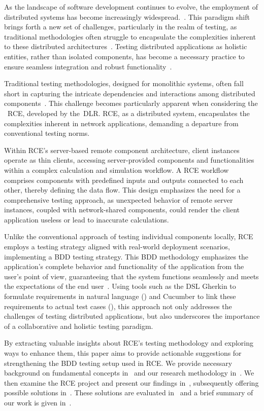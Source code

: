 As the landscape of software development continues to evolve, the employment of distributed systems has become increasingly widespread.~\cite{Xingang2018,Feldman1978}. This paradigm shift brings forth a new set of challenges, particularly in the realm of testing, as traditional methodologies often struggle to encapsulate the complexities inherent to these distributed architectures~\cite{Liu,Lima2017}. Testing distributed applications as holistic entities, rather than isolated components, has become a necessary practice to ensure seamless integration and robust functionality~\cite{Liu,Lima2017}.

Traditional testing methodologies, designed for monolithic systems, often fall short in capturing the intricate dependencies and interactions among distributed components~\cite{Liu,Lima2017}. This challenge becomes particularly apparent when considering the ~\acf{RCE}, developed by the~\acf{DLR}. \ac{RCE}, as a distributed system, encapsulates the complexities inherent in network applications, demanding a departure from conventional testing norms.

Within \ac{RCE}'s server-based remote component architecture, client instances operate as thin clients, accessing server-provided components and functionalities within a complex calculation and simulation workflow. A \ac{RCE} workflow comprises components with predefined inputs and outputs connected to each other, thereby defining the data flow. This design emphasizes the need for a comprehensive testing approach, as unexpected behavior of remote server instances, coupled with network-shared components, could render the client application useless or lead to inaccurate calculations.

Unlike the conventional approach of testing individual components locally, \ac{RCE} employs a testing strategy aligned with real-world deployment scenarios, implementing a \ac{BDD} testing strategy. This \ac{BDD} methodology emphasizes the application's complete behavior and functionality of the application from the user's point of view, guaranteeing that the system functions seamlessly and meets the expectations of the end user~\cite{wynne2012cucumber}. Using tools such as the \ac{DSL} Gherkin to formulate requirements in natural language () and Cucumber to link these requirements to actual test cases (), this approach not only addresses the challenges of testing distributed applications, but also underscores the importance of a collaborative and holistic testing paradigm.

By extracting valuable insights about \ac{RCE}'s testing methodology and exploring ways to enhance them, this paper aims to provide actionable suggestions for strengthening the \ac{BDD} testing setup used in \ac{RCE}. We provide necessary background on fundamental concepts in~ and our research methodology in~. We then examine the \ac{RCE} project and present our findings in~, subsequently offering possible solutions in~. These solutions are evaluated in~ and a brief summary of our work is given in~.